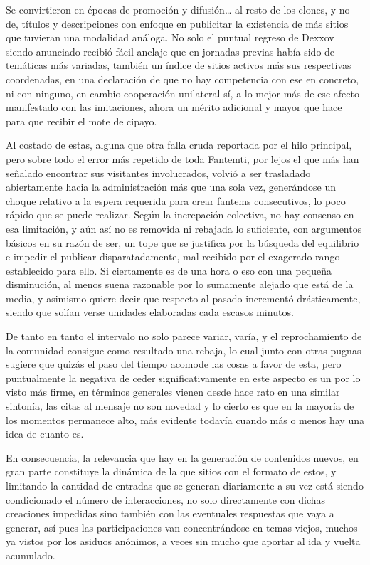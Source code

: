 \documentclass[
]{book}
\begin{document}
Se convirtieron en épocas de promoción y difusión\ldots{} al resto de los clones, y no de, títulos y descripciones con enfoque en publicitar la existencia de más sitios que tuvieran una modalidad análoga. No solo el puntual regreso de Dexxov siendo anunciado recibió fácil anclaje que en jornadas previas había sido de temáticas más variadas, también un índice de sitios activos más sus respectivas coordenadas, en una declaración de que no hay competencia con ese en concreto, ni con ninguno, en cambio cooperación unilateral sí, a lo mejor más de ese afecto manifestado con las imitaciones, ahora un mérito adicional y mayor que hace para que recibir el mote de cipayo.

Al costado de estas, alguna que otra falla cruda reportada por el hilo principal, pero sobre todo el error más repetido de toda Fantemti, por lejos el que más han señalado encontrar sus visitantes involucrados, volvió a ser trasladado abiertamente hacia la administración más que una sola vez, generándose un choque relativo a la espera requerida para crear fantems consecutivos, lo poco rápido que se puede realizar. Según la increpación colectiva, no hay consenso en esa limitación, y aún así no es removida ni rebajada lo suficiente, con argumentos básicos en su razón de ser, un tope que se justifica por la búsqueda del equilibrio e impedir el publicar disparatadamente, mal recibido por el exagerado rango establecido para ello. Si ciertamente es de una hora o eso con una pequeña disminución, al menos suena razonable por lo sumamente alejado que está de la media, y asimismo quiere decir que respecto al pasado incrementó drásticamente, siendo que solían verse unidades elaboradas cada escasos minutos.

De tanto en tanto el intervalo no solo parece variar, varía, y el reprochamiento de la comunidad consigue como resultado una rebaja, lo cual junto con otras pugnas sugiere que quizás el paso del tiempo acomode las cosas a favor de esta, pero puntualmente la negativa de ceder significativamente en este aspecto es un por lo visto más firme, en términos generales vienen desde hace rato en una similar sintonía, las citas al mensaje no son novedad y lo cierto es que en la mayoría de los momentos permanece alto, más evidente todavía cuando más o menos hay una idea de cuanto es.

En consecuencia, la relevancia que hay en la generación de contenidos nuevos, en gran parte constituye la dinámica de la que sitios con el formato de estos, y limitando la cantidad de entradas que se generan diariamente a su vez está siendo condicionado el número de interacciones, no solo directamente con dichas creaciones impedidas sino también con las eventuales respuestas que vaya a generar, así pues las participaciones van concentrándose en temas viejos, muchos ya vistos por los asiduos anónimos, a veces sin mucho que aportar al ida y vuelta acumulado.
\end{document}
